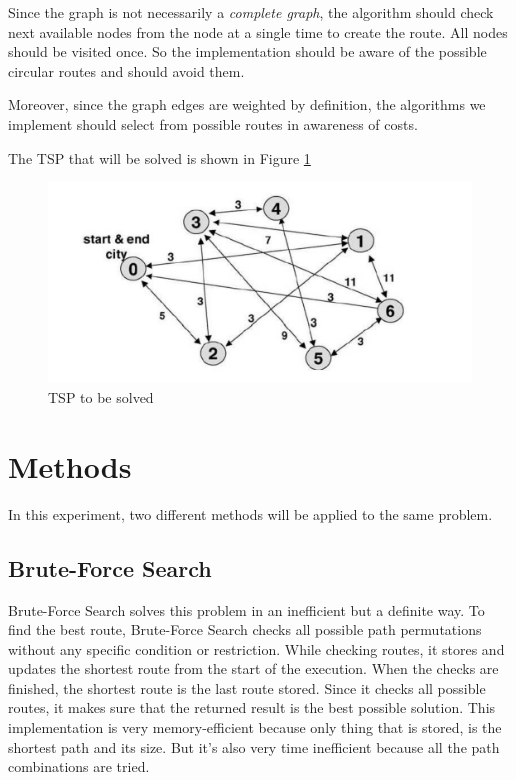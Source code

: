 \documentclass[journal,transmag]{IEEEtran}
\begin{document}
    Since the graph is not necessarily a \textit{complete graph}, the algorithm
    should check next available nodes from the node at a single time to create
    the route. All nodes should be visited once. So the implementation should be
    aware of the possible circular routes and should avoid them.

    Moreover, since the graph edges are weighted by definition, the algorithms we
    implement should select from possible routes in awareness of costs.

    The TSP that will be solved is shown in Figure \ref{fig:tsp-problem}

    \begin{figure}[H]
        \includegraphics[width=\linewidth]{tsp.png}
        \caption{TSP to be solved}
        \label{fig:tsp-problem}
    \end{figure}


    \section{Methods}

    In this experiment, two different methods will be applied to the same problem.

    \subsection{Brute-Force Search}

    Brute-Force Search solves this problem in an inefficient but a definite way.
    To find the best route, Brute-Force Search checks all possible path
    permutations without any specific condition or restriction. While checking
    routes, it stores and updates the shortest route from the start of the
    execution. When the checks are finished, the shortest route is the last
    route stored. Since it checks all possible routes, it makes sure that the
    returned result is the best possible solution. This implementation is very
    memory-efficient because only thing that is stored, is the shortest path and
    its size. But it's also very time inefficient because all the path
    combinations are tried.
\end{document}
